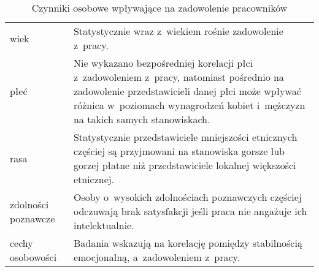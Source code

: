 \noindent\begin{minipage}{\textwidth}
             \begin{table}[H]
                 \raggedright\caption{Czynniki osobowe wpływające na zadowolenie pracowników\label{tabela:zadowolenie-pracownikow-osoba}}
                 \begin{center}
                     \begin{tabular}{|P{.2\textwidth}|P{.7\textwidth}|}

                         \hline
                          &
                          \\
                         \hline

                         wiek &
                         Statystycznie wraz z~wiekiem rośnie zadowolenie z~pracy.\\
                         \hline

                         płeć &
                         Nie wykazano bezpośredniej korelacji płci z~zadowoleniem z~pracy,
                         natomiast pośrednio na zadowolenie przedstawicieli danej płci może wpływać różnica w~poziomach wynagrodzeń kobiet i~mężczyzn na takich samych stanowiskach. \\
                         \hline

                         rasa &
                         Statystycznie przedstawiciele mniejszości etnicznych częściej są przyjmowani na stanowiska gorsze lub gorzej płatne niż przedstawiciele lokalnej większości etnicznej. \\
                         \hline

                         zdolności poznawcze &
                         Osoby o~wysokich zdolnościach poznawczych częściej odczuwają brak satysfakcji jeśli praca nie angażuje ich intelektualnie. \\
                         \hline

                         cechy osobowości &
                         Badania wskazują na korelację pomiędzy stabilnością emocjonalną, a~zadowoleniem z~pracy. \\
                         \hline

                     \end{tabular}
                 \end{center}
                 \raggedright{}
                 \vspace{0.75cm}
             \end{table}
\end{minipage}

